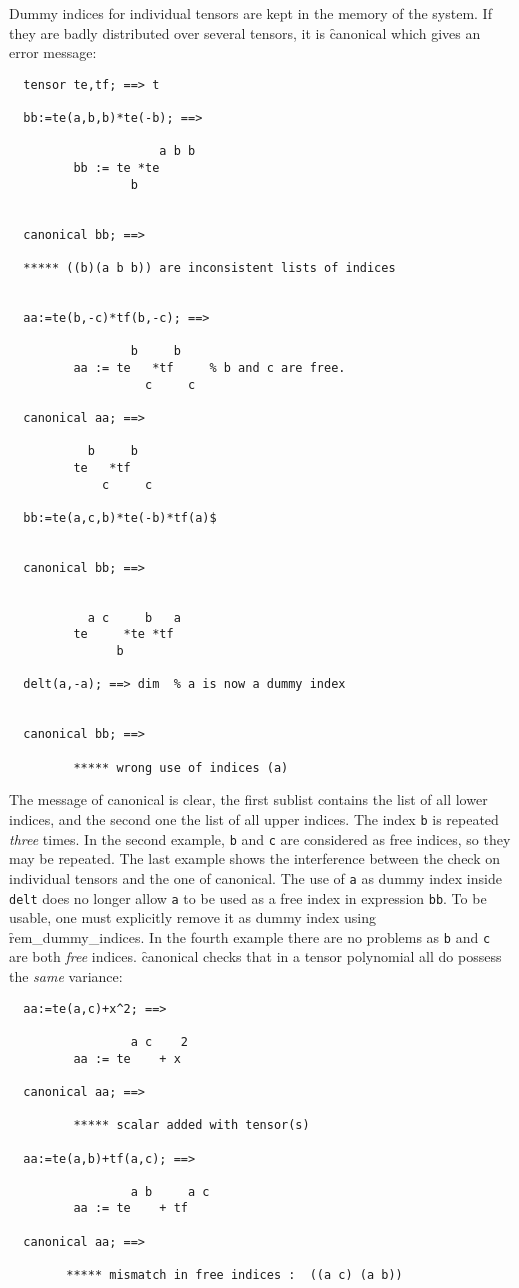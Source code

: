 Dummy indices for individual tensors are kept in the memory of
the system. If they are badly distributed over several tensors,
it is \f{canonical} which gives an error message:
\begin{verbatim}
  tensor te,tf; ==> t

  bb:=te(a,b,b)*te(-b); ==>

                     a b b
         bb := te *te
                 b


  canonical bb; ==>

  ***** ((b)(a b b)) are inconsistent lists of indices


  aa:=te(b,-c)*tf(b,-c); ==>

                 b     b
         aa := te   *tf     % b and c are free.
                   c     c

  canonical aa; ==>

           b     b
         te   *tf
             c     c

  bb:=te(a,c,b)*te(-b)*tf(a)$


  canonical bb; ==>


           a c     b   a
         te     *te *tf
               b

  delt(a,-a); ==> dim  % a is now a dummy index


  canonical bb; ==>

         ***** wrong use of indices (a)
\end{verbatim}
The message of canonical is clear, the first sublist contains the
list of all lower indices, and the second one the list of all upper
indices. The index  \texttt{b} is repeated \emph{three} times.
In the second example, \texttt{b} and \texttt{c} are considered as free
indices, so they may be repeated.
The last example shows the interference between the check on
individual tensors and the one of canonical. The use of \texttt{a}
as dummy index inside \texttt{delt} does no longer allow \texttt{a}
to be used as a free index in expression \texttt{bb}.
To be usable, one must explicitly remove it as dummy index
using \f{rem\_dummy\_indices}.
In the fourth example there are no problems as \texttt{b} and
\texttt{c} are both \emph{free} indices.
\f{canonical} checks that in a tensor polynomial
all do possess the \emph{same} variance:
\begin{verbatim}
  aa:=te(a,c)+x^2; ==>

                 a c    2
         aa := te    + x

  canonical aa; ==>

         ***** scalar added with tensor(s)

  aa:=te(a,b)+tf(a,c); ==>

                 a b     a c
         aa := te    + tf

  canonical aa; ==>

        ***** mismatch in free indices :  ((a c) (a b))
\end{verbatim}
